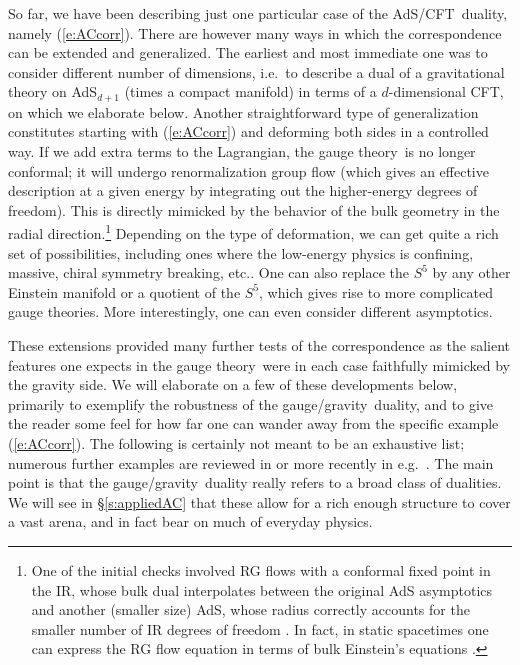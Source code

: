 \documentclass[12pt,a4paper]{article}
\def\sect#1{\S\ref{#1}}
\def\req#1{(\ref{#1})}
\def\AC{AdS/CFT}
\def\GG{gauge/gravity}
\def\GT{gauge theory}
\begin{document}
So far, we have been describing just one particular case of the \AC\ duality, namely \req{e:ACcorr}.  There are however many ways in which the correspondence can be extended and generalized.  The earliest and most immediate one was to consider different number of dimensions, i.e.\ to describe a dual of a gravitational theory on AdS$_{d+1}$ (times a compact manifold) in terms of a $d$-dimensional CFT, on which we elaborate below.  
Another straightforward type of generalization constitutes starting with \req{e:ACcorr} and deforming both sides in a controlled way.  If we add extra terms to the Lagrangian, the \GT\ is no longer conformal; it will undergo renormalization group flow (which gives an effective description at a given energy by integrating out the higher-energy degrees of freedom).  This is directly mimicked by the behavior of the bulk geometry in the radial direction.\footnote{
One of the initial checks involved RG flows with a conformal fixed point in the IR, whose bulk dual interpolates between the original AdS asymptotics and another (smaller size) AdS, whose radius correctly accounts for the smaller number of IR degrees of freedom
\cite{Freedman:1999gp}.
In fact, in static spacetimes one can express the RG flow equation in terms of bulk Einstein's equations \cite{deBoer:1999xf}.
}  Depending on the type of deformation, we can get quite a rich set of possibilities, including ones where the  low-energy physics is confining, massive, chiral symmetry breaking, etc..  One can also replace the $S^5$ by any other Einstein manifold or a quotient of the $S^5$, which gives rise to more complicated gauge theories.
More interestingly, one can even consider different asymptotics.  

These extensions provided many further tests of the correspondence as the salient features one expects in the \GT\ were in each case faithfully mimicked by the gravity side.  
We will elaborate on a few of these developments below, primarily to exemplify the robustness of the \GG\ duality, and to give the reader some feel for how far one can wander away from the specific example \req{e:ACcorr}.  The following is certainly not meant to be an exhaustive list; numerous further examples are reviewed in \cite{Aharony:1999ti} or more recently in e.g.\ \cite{Polchinski:2010hw}.
The main point is that the \GG\ duality really refers to a broad class of dualities.  We will see in \sect{s:appliedAC}  that these allow for a rich enough structure to cover a vast arena, and in fact bear on much of everyday physics.
\end{document}
